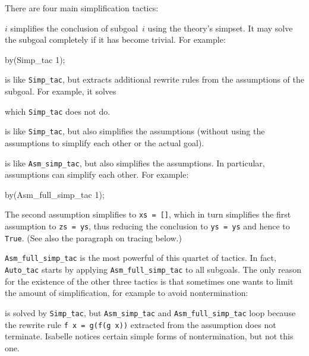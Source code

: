 There are four main simplification tactics:
\begin{ttdescription}
\item[\ttindexbold{Simp_tac} $i$] simplifies the conclusion of subgoal~$i$
  using the theory's simpset.  It may solve the subgoal completely if it has
  become trivial. For example:
\begin{ttbox}\makeatother
{}
by(Simp_tac 1);
\end{ttbox}

\item[\ttindexbold{Asm_simp_tac}]
  is like \verb$Simp_tac$, but extracts additional rewrite rules from
  the assumptions of the subgoal. For example, it solves
\begin{ttbox}\makeatother
{}
\end{ttbox}
which \texttt{Simp_tac} does not do.
  
\item[\ttindexbold{Full_simp_tac}] is like \verb$Simp_tac$, but also
  simplifies the assumptions (without using the assumptions to
  simplify each other or the actual goal).

\item[\ttindexbold{Asm_full_simp_tac}] is like \verb$Asm_simp_tac$,
  but also simplifies the assumptions. In particular, assumptions can
  simplify each other. For example:
\begin{ttbox}\makeatother
{}
by(Asm_full_simp_tac 1);
\end{ttbox}
The second assumption simplifies to \texttt{xs = []}, which in turn
simplifies the first assumption to \texttt{zs = ys}, thus reducing the
conclusion to \texttt{ys = ys} and hence to \texttt{True}.
(See also the paragraph on tracing below.)
\end{ttdescription}
\texttt{Asm_full_simp_tac} is the most powerful of this quartet of
tactics. In fact, \texttt{Auto_tac} starts by applying
\texttt{Asm_full_simp_tac} to all subgoals. The only reason for the existence
of the other three tactics is that sometimes one wants to limit the amount of
simplification, for example to avoid nontermination:
\begin{ttbox}\makeatother
{}
\end{ttbox}
is solved by \texttt{Simp_tac}, but \texttt{Asm_simp_tac} and
\texttt{Asm_full_simp_tac} loop because the rewrite rule \texttt{f x = g(f(g
x))} extracted from the assumption does not terminate.  Isabelle notices
certain simple forms of nontermination, but not this one.
 

